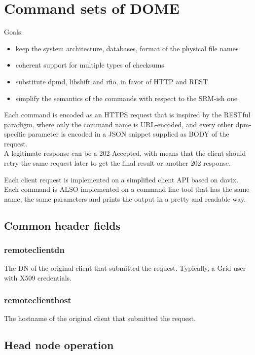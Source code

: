 \documentclass[a4paper,10pt]{scrreprt}
\begin{document}
\section{Command sets of DOME}
Goals:

\begin{itemize}
\item keep the system architecture, databases, format of the physical file names
\item coherent support for multiple types of checksums
\item substitute dpmd, libshift and rfio, in favor of HTTP and REST
\item simplify the semantics of the commands with respect to the SRM-ish one
\end{itemize}


Each command is encoded as an HTTPS request that is inspired by the RESTful paradigm, where only the command name is URL-encoded, and every other dpm-specific parameter is encoded in a JSON snippet supplied as BODY of the request.\\

A legitimate response can be a 202-Accepted, with means that the client should retry the same request later to get the final result or another 202 response.

Each client request is implemented on a simplified client API based on davix.
Each command is ALSO implemented on a command line tool that has the same name, the same parameters and prints the output in a pretty and readable way.\\

\subsection{Common header fields}


\subsubsection{remoteclientdn}
The DN of the original client that submitted the request. Typically, a Grid user with X509 credentials.\\

\subsubsection{remoteclienthost}
The hostname of the original client that submitted the request.


\subsection{Head node operation}
\end{document}

